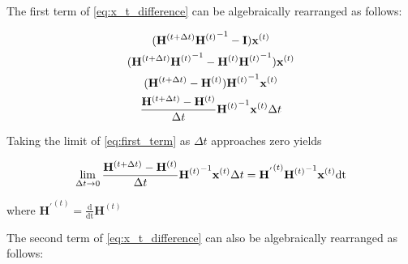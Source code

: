 \documentclass[12pt,]{article}
\begin{document}
\noindent The first term of \eqref{eq:x_t_difference} can be algebraically rearranged as follows:

\begin{gather}
    (\mathbf{H}^{(t + \Delta t)} {\mathbf{H}^{(t)}}^{\hspace{0mm}-1} - \mathbf{I}) \mathbf{x}^{(t)} \\
    (\mathbf{H}^{(t + \Delta t)} {\mathbf{H}^{(t)}}^{\hspace{0mm}-1} - \mathbf{H}^{(t)} {\mathbf{H}^{(t)}}^{\hspace{0mm}-1}) \mathbf{x}^{(t)} \\
    (\mathbf{H}^{(t + \Delta t)}  - \mathbf{H}^{(t)}) {\mathbf{H}^{(t)}}^{\hspace{0mm}-1} \mathbf{x}^{(t)} \\
    \frac{\mathbf{H}^{(t + \Delta t)}  - \mathbf{H}^{(t)}}{\Delta t} {\mathbf{H}^{(t)}}^{\hspace{0mm}-1} \mathbf{x}^{(t)} \Delta t \label{eq:first_term}
\end{gather}

\noindent Taking the limit of \eqref{eq:first_term} as $\Delta t$ approaches zero yields

\begin{gather}
    \lim_{\Delta t \rightarrow 0} \frac{\mathbf{H}^{(t + \Delta t)}  - \mathbf{H}^{(t)}}{\Delta t} {\mathbf{H}^{(t)}}^{\hspace{0mm}-1} \mathbf{x}^{(t)} \Delta t = \mathbf{H^{'}}^{(t)}{\mathbf{H}^{(t)}}^{\hspace{0mm}-1} \mathbf{x}^{(t)} \text{dt}
\end{gather}

\noindent where $\mathbf{H^{'}}^{(t)} = \frac{\text{d}}{\text{dt}} \mathbf{H}^{(t)} $

The second term of \eqref{eq:x_t_difference} can also be algebraically rearranged as follows:
\end{document}
